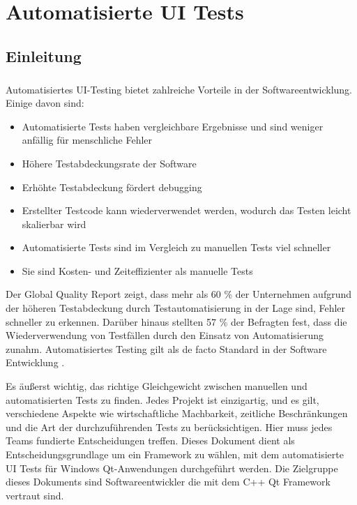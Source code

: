 \chapter{Automatisierte UI Tests}
	\section{Einleitung}  %
		\paragraph{} Automatisiertes UI-Testing bietet zahlreiche Vorteile in der Softwareentwicklung. Einige davon sind:
		
		\begin{itemize}
			\item Automatisierte Tests haben vergleichbare Ergebnisse und sind weniger anfällig für menschliche Fehler
			\item Höhere Testabdeckungsrate der Software
			\item Erhöhte Testabdeckung fördert debugging
			\item Erstellter Testcode kann wiederverwendet werden, wodurch das Testen leicht skalierbar wird
			\item Automatisierte Tests sind im Vergleich zu manuellen Tests viel schneller
			\item Sie sind Kosten- und Zeiteffizienter als manuelle Tests
		\end{itemize}		
		
		Der Global Quality Report zeigt, dass mehr als 60 \% der Unternehmen aufgrund der höheren Testabdeckung durch Testautomatisierung in der Lage sind, Fehler schneller zu erkennen. Darüber hinaus stellten 57 \% der Befragten fest, dass die Wiederverwendung von Testfällen durch den Einsatz von Automatisierung zunahm. Automatisiertes Testing gilt als de facto Standard in der Software Entwicklung \cite{capgemini2021microfocus}. 
		
		
		Es äußerst wichtig, das richtige Gleichgewicht zwischen manuellen und automatisierten Tests zu finden. Jedes Projekt ist einzigartig, und es gilt, verschiedene Aspekte wie wirtschaftliche Machbarkeit, zeitliche Beschränkungen und die Art der durchzuführenden Tests zu berücksichtigen. Hier muss jedes Teams fundierte Entscheidungen treffen. Dieses Dokument dient als Entscheidungsgrundlage um ein Framework zu wählen, mit dem automatisierte UI Tests für Windows Qt-Anwendungen durchgeführt werden. Die Zielgruppe dieses Dokuments sind Softwareentwickler die mit dem C++ Qt Framework vertraut sind.
		
